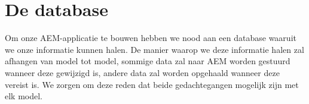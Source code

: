 
	\section{De database}
	Om onze AEM-applicatie te bouwen hebben we nood aan een database waaruit we onze informatie kunnen halen.
	De manier waarop we deze informatie halen zal afhangen van model tot model, sommige data zal naar AEM worden gestuurd wanneer deze gewijzigd is, andere data zal worden opgehaald wanneer deze vereist is. We zorgen om deze reden dat beide gedachtegangen mogelijk zijn met elk model.